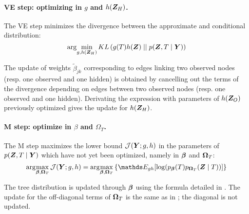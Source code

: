 \paragraph{VE step: optimizing in $g$ and $h(\boldsymbol{Z}_H)$.}
The VE step minimizes the divergence between the approximate and conditional distribution:
$$  \arg\!\min_{g,h(\boldsymbol{Z}_H)} KL\left(g(T)h(\boldsymbol{Z}) \mid\mid p(\boldsymbol{Z},T\mid \boldsymbol{Y})\right)$$

The update of  weights $\widetilde{\beta}_{jk}$ corresponding to edges linking two observed nodes (resp. one observed and one hidden) is obtained by cancelling out the terms of the divergence depending on edges between two observed nodes (resp. one observed and one hidden).
Derivating the expression with parameters of $h(\boldsymbol{Z}_O)$ previously optimized gives the update for  $h(\boldsymbol{Z}_H)$.
 
\paragraph{M step: optimize in $\beta$ and $\Omega_T$.}
The M step maximizes the lower bound  $\mathcal{J}(\boldsymbol{Y} ; g,h)$ in the parameters of $p(\boldsymbol{Z},T\mid \boldsymbol{Y})$ which have not yet been optimized, namely in $\boldsymbol{\beta}$ and $\boldsymbol{\Omega}_T$:
$$ \argmax_{\betabf, \Omegabf_T} \mathcal{J}(\Ybf ; g,h) =\argmax_{\betabf, \Omegabf_T} \left\{ \Esp_{gh} [\log (p_{\betabf}(T) p_{\Omegabf_T}(\Zbf\mid T))]\right\} $$

The tree distribution is updated through  $\boldsymbol{\beta}$ using the formula detailed in  \citet{MRA20}. The update for the off-diagonal terms of   $\boldsymbol{\Omega}_T$  is the same as in  \citet{genvieve}; the diagonal is not updated.